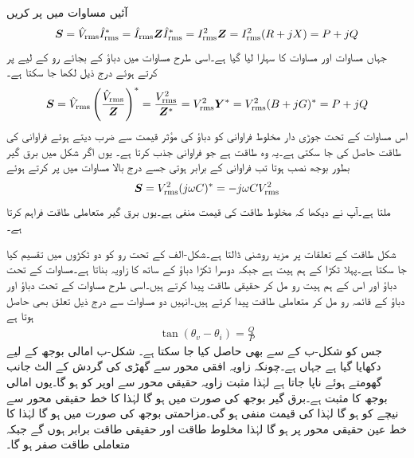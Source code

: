 آئیں مساوات  میں  پر کریں
\begin{align}
{\ensuremath{{\boldsymbol{S}}}}={\hat{V}_{\textup{rms}}}{\hat{I}^{*}_{\textup{rms}}}={\hat{I}_{\textup{rms}}}{{\boldsymbol{Z}}}{\hat{I}^{*}_{\textup{rms}}}={I^2_{\textup{rms}}}{{\boldsymbol{Z}}}={I^2_{\textup{rms}}}(R+jX)=P+jQ
\end{align}
جہاں مساوات  اور مساوات  کا سہارا لیا گیا ہے۔اسی طرح مساوات  میں دباؤ کے بجائے رو کے لیے پر کرتے ہوئے درج ذیل لکھا جا سکتا ہے۔
\begin{align}
{\ensuremath{{\boldsymbol{S}}}}={\hat{V}_{\textup{rms}}}\left(\frac{{\hat{V}_{\textup{rms}}}}{{{\boldsymbol{Z}}}}\right)^*=\frac{{V^2_{\textup{rms}}}}{{{\boldsymbol{Z}}^{*}}}={V^2_{\textup{rms}}} {{\boldsymbol{Y}}^{*}}={V^2_{\textup{rms}}}(B+jG)^*=P+jQ
\end{align}
اس مساوات کے تحت جوڑی دار مخلوط فراوانی کو دباؤ کی مؤثر قیمت سے ضرب دیتے ہوئے فراوانی کی طاقت حاصل کی جا سکتی ہے۔یہ وہ طاقت ہے جو فراوانی جذب کرتا ہے۔  یوں اگر شکل  میں برق گیر بطور بوجھ  نصب ہوتا تب فراوانی  کے برابر ہوتی جسے درج بالا مساوات میں پر کرتے ہوئے
\begin{align}\label{مساوات_طاقت_برق_گیر_مخلوط_طاقت}
{\ensuremath{{\boldsymbol{S}}}}={V^2_{\textup{rms}}} (j\omega C)^*=-j\omega C {V^2_{\textup{rms}}}
\end{align}
ملتا ہے۔آپ نے دیکھا کہ مخلوط طاقت کی قیمت منفی ہے۔یوں برق گیر متعاملی طاقت فراہم کرتا ہے۔

شکل  طاقت کے تعلقات پر  مزید روشنی ڈالتا ہے۔شکل-الف کے تحت رو کو دو ٹکڑوں میں تقسیم کیا جا سکتا ہے۔پہلا ٹکڑا  کے ہم ہیت ہے جبکہ دوسرا ٹکڑا دباؤ کے ساتھ  کا زاویہ بناتا ہے۔مساوات  کے تحت دباؤ اور اس کے ہم ہیت رو مل کر حقیقی طاقت  پیدا کرتے ہیں۔اسی طرح مساوات  کے تحت دباؤ اور دباؤ کے قائمہ  رو مل کر متعاملی طاقت  پیدا کرتے ہیں۔انہیں دو مساوات سے درج ذیل تعلق بھی حاصل ہوتا ہے
\begin{align}
\tan(\theta_v-\theta_i)=\frac{Q}{P}
\end{align}
جس کو شکل-ب کے  سے بھی حاصل کیا جا سکتا ہے۔
 شکل-ب امالی بوجھ کے لیے دکھایا گیا ہے جہاں  ہے۔چونکہ زاویہ افقی محور سے گھڑی کی گردش کے الٹ جانب گھومتے ہوئے ناپا جاتا ہے لہٰذا مثبت زاویہ حقیقی محور سے اوپر کو ہو گا۔یوں امالی بوجھ کا  مثبت ہے۔برق گیر بوجھ کی صورت میں  ہو گا لہٰذا  کا خط حقیقی محور سے نیچے کو ہو گا لہٰذا  کی قیمت منفی ہو گی۔مزاحمتی بوجھ کی صورت میں  ہو گا لہٰذا  کا خط عین حقیقی محور پر ہو گا لہٰذا مخلوط طاقت اور حقیقی طاقت برابر ہوں گے جبکہ متعاملی طاقت صفر ہو گا۔

